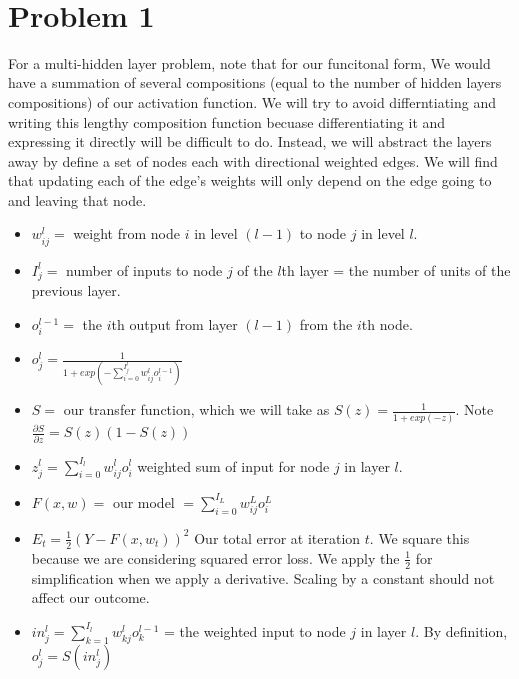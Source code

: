 \documentclass[11pt]{article}
\begin{document}
\begin{center}

\ \\
\end{center}

\section*{Problem 1}

\vspace{5 mm}
\noindent
For a multi-hidden layer problem, note that for our funcitonal form, We would 
have a summation of several compositions (equal to the number of hidden layers 
compositions) of our activation function. We will try to avoid differntiating 
and writing this lengthy composition function becuase differentiating it and 
expressing it directly will be difficult to do. Instead, we will abstract the 
layers away by define a set of nodes each with directional weighted edges. We 
will find that updating each of the edge's weights will only depend on the 
edge going to and leaving that node. 

\begin{itemize}
\item $w_{ij}^{l} = $ weight from node $i$ in level $(l - 1)$ to node $j$ in 
level $l$.
\item $I_{j}^{l} = $ number of inputs to node $j$ of the $l$th layer = 
the number of units of the previous layer.
\item $o_{i}^{l - 1} = $ the $i$th output from layer $(l -1)$ from the $i$th 
node.
\item $o_{j}^{l} = \frac{1}{1 + exp(-\sum_{i = 0}^{I_{j}^{l}} 
w_{ij}^{l} o_{i}^{l - 1})}$
\item $S = $ our transfer function, which we will take as $S(z) = 
\frac{1}{1 + exp(-z)}$. Note $\frac{\partial S}{\partial z} = S(z)(1 - S(z))$
\item $z_{j}^{l} = \sum_{i = 0}^{I_{l}} w_{ij}^{l} o_{i}^{l}$ weighted sum of 
input for node $j$ in layer $l$.
\item $F(x, w) = $ our model $ = \sum_{i = 0}^{I_{L}} w_{ij}^{L} o_{i}^{L}$
\item $E_{t} = \frac{1}{2}(Y - F(x, w_{t}))^{2} $ Our total error at iteration 
$t$. We square this because we are considering squared error loss. We apply the 
$\frac{1}{2}$ for simplification when we apply a derivative. Scaling by a 
constant should not affect our outcome.
\item $in_{j}^{l} = \sum_{k = 1}^{I_{l}} w_{kj}^{l} o_{k}^{l - 1} $ = the 
weighted input to node $j$ in layer $l$. By definition, 
$o_{j}^{l} = S(in_{j}^{l})$
\end{itemize}
\end{document}
